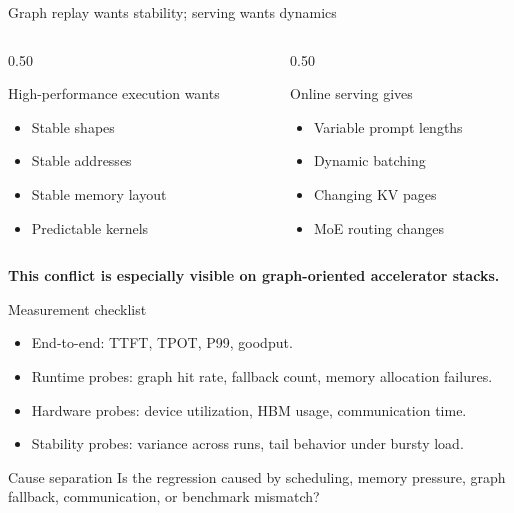 \documentclass[aspectratio=169,11pt]{beamer}
\newcommand{\key}[1]{\textcolor{HUSTDeep}{\textbf{#1}}}
\begin{document}
\begin{frame}{Graph replay wants stability; serving wants dynamics}
  \begin{columns}[T,totalwidth=\textwidth]
    \begin{column}{0.50\textwidth}
      \begin{block}{High-performance execution wants}
        \begin{itemize}
          \item Stable shapes
          \item Stable addresses
          \item Stable memory layout
          \item Predictable kernels
        \end{itemize}
      \end{block}
    \end{column}
    \begin{column}{0.50\textwidth}
      \begin{block}{Online serving gives}
        \begin{itemize}
          \item Variable prompt lengths
          \item Dynamic batching
          \item Changing KV pages
          \item MoE routing changes
        \end{itemize}
      \end{block}
    \end{column}
  \end{columns}
  \vspace{0.3cm}
  \key{This conflict is especially visible on graph-oriented accelerator stacks.}
\end{frame}

\begin{frame}{Measurement checklist}
  \begin{itemize}
    \item End-to-end: TTFT, TPOT, P99, goodput.
    \item Runtime probes: graph hit rate, fallback count, memory allocation failures.
    \item Hardware probes: device utilization, HBM usage, communication time.
    \item Stability probes: variance across runs, tail behavior under bursty load.
  \end{itemize}
  \vspace{0.3cm}
  \begin{block}{Cause separation}
    Is the regression caused by scheduling, memory pressure, graph fallback, communication, or benchmark mismatch?
  \end{block}
\end{frame}
\end{document}
